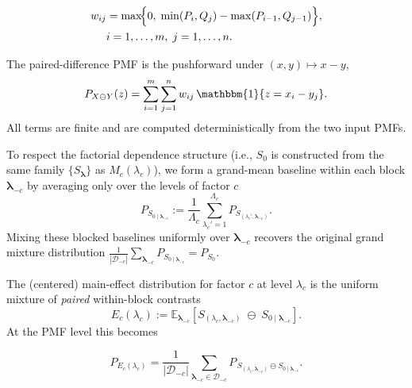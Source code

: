 {\small
\begin{align}
\label{eq:comonotone-coupling-mass}
w_{ij}
&=
\max\!\Bigl\{
0,\;
\min(P_i,Q_j) - \max(P_{i-1},Q_{j-1})
\Bigr\},\\
&i=1,\dots,m,\; j=1,\dots,n.
\end{align}
}

The paired-difference PMF is the pushforward under $(x,y)\mapsto x-y$,
\begin{equation}
\label{eq:paired-diff-pmf}
P_{X\ominus Y}(z)
=
\sum_{i=1}^m\sum_{j=1}^n
w_{ij}\,\mathbbm{1}\{z=x_i-y_j\}.
\end{equation}
All terms are finite and are computed deterministically from the two input PMFs.

To respect the factorial dependence structure (i.e., $S_0$ is constructed
from the same family $\{S_{\boldsymbol{\lambda}}\}$ as $M_c(\lambda_c)$), we form
a grand-mean baseline within each block $\boldsymbol{\lambda}_{-c}$ by
averaging only over the levels of factor $c$
\begin{equation}
\label{eq:blocked-grand-mean}
P_{S_{0\mid \boldsymbol{\lambda}_{-c}}}
:=
\frac{1}{\Lambda_c}
\sum_{\lambda_c'=1}^{\Lambda_c}
P_{S_{(\lambda_c',\boldsymbol{\lambda}_{-c})}}.
\end{equation}
Mixing these blocked baselines uniformly over $\boldsymbol{\lambda}_{-c}$ recovers
the original grand mixture distribution
\(
\frac{1}{|\mathcal{D}_{-c}|}\sum_{\boldsymbol{\lambda}_{-c}} P_{S_{0\mid \boldsymbol{\lambda}_{-c}}}
= P_{S_0}.
\)

The (centered) main-effect distribution for factor $c$ at level
$\lambda_c$ is the uniform mixture of \emph{paired} within-block contrasts
\begin{equation}
\label{eq:main-effect-dist}
E_c(\lambda_c)
:=
\mathbb{E}_{\boldsymbol{\lambda}_{-c}}
\!\left[
S_{(\lambda_c,\boldsymbol{\lambda}_{-c})}
\;\ominus\;
S_{0\mid \boldsymbol{\lambda}_{-c}}
\right].
\end{equation}
At the PMF level this becomes

{\small
\begin{equation}
\label{eq:main-effect-pmf}
P_{E_c(\lambda_c)}
=
\frac{1}{|\mathcal{D}_{-c}|}
\sum_{\boldsymbol{\lambda}_{-c}\in\mathcal{D}_{-c}}
P_{\,S_{(\lambda_c,\boldsymbol{\lambda}_{-c})}\ominus S_{0\mid \boldsymbol{\lambda}_{-c}}}.
\end{equation}
}

